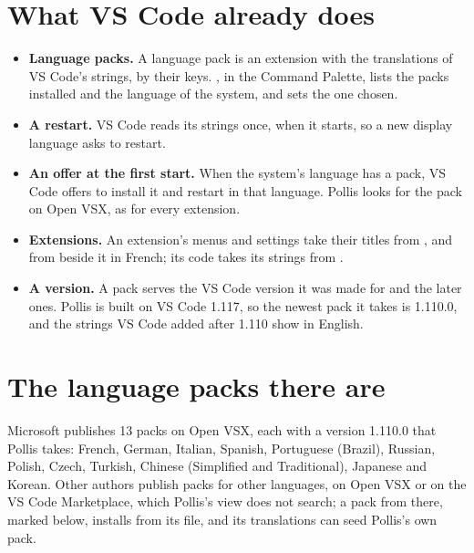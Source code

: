 \section{What VS Code already does}\label{sec:vscode}
\begin{itemize}
  \item \textbf{Language packs.} A language pack is an extension with the translations of VS Code's strings, by their
    keys. , in the Command Palette, lists the packs installed and the language of the
    system, and sets the one chosen.
  \item \textbf{A restart.} VS Code reads its strings once, when it starts, so a new display language asks to restart.
  \item \textbf{An offer at the first start.} When the system's language has a pack, VS Code offers to install it and
    restart in that language. Pollis looks for the pack on Open VSX, as for every extension.
  \item \textbf{Extensions.} An extension's menus and settings take their titles from , and
    from  beside it in French; its code takes its strings from
    .
  \item \textbf{A version.} A pack serves the VS Code version it was made for and the later ones. Pollis is built on
    VS Code 1.117, so the newest pack it takes is 1.110.0, and the strings VS Code added after 1.110 show in English.
\end{itemize}

\section{The language packs there are}\label{sec:packs}
Microsoft publishes 13 packs on Open VSX, each with a version 1.110.0 that Pollis takes: French, German, Italian,
Spanish, Portuguese (Brazil), Russian, Polish, Czech, Turkish, Chinese (Simplified and Traditional), Japanese and
Korean. Other authors publish packs for other languages, on Open VSX or on the VS Code Marketplace, which Pollis's
 view does not search; a pack from there, marked \dag{} below, installs from its  file, and
its translations can seed Pollis's own pack.

